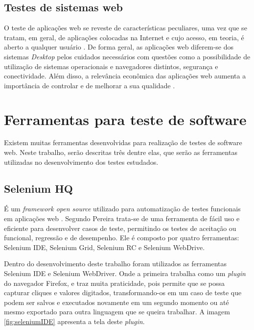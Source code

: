 \documentclass[tg]{mdtufsm}
\begin{document}
\subsection{Testes de sistemas web}
O teste de aplicações web se reveste de características peculiares, uma vez que se tratam, em geral, de aplicações colocadas na Internet e cujo acesso, em teoria,
é aberto a qualquer usuário \cite{rios2006teste}.  De forma geral, as aplicações web diferem-se dos sistemas \emph{Desktop} pelos cuidados necessários com questões como a
possibilidade de utilização de sistemas operacionais e navegadores distintos, segurança e conectividade. Além disso, a relevância econômica das aplicações web aumenta a
importância de controlar e de melhorar a sua qualidade \cite{fidelis2004fireweb}.


\section{Ferramentas para teste de software}
Existem muitas ferramentas desenvolvidas para realização de testes de software web. Neste trabalho, serão descritas três dentre elas, que serão as ferramentas utilizadas no desenvolvimento dos testes estudados.

\subsection{Selenium HQ}
É um \emph{framework open source} utilizado para automatização de testes funcionais em aplicações web \cite{chiavegatto1desenvolvimento}. Segundo Pereira \citeyearpar{pereiraestudoselenium} trata-se
de uma ferramenta de fácil uso e eficiente para desenvolver casos de teste, permitindo os testes de aceitação ou funcional, regressão e de desempenho.
Ele é composto por quatro ferramentas: Selenium IDE, Selenium Grid, Selenium RC e Selenium WebDrive.

Dentro do desenvolvimento deste trabalho foram utilizados as ferramentas Selenium IDE e Selenium WebDriver. Onde a primeira trabalha como um \emph{plugin} do navegador Firefox, e traz muita praticidade, pois permite que se possa capturar cliques e valores digitados, transformando-os em um caso de teste que podem ser salvos e executados novamente em um segundo momento ou até mesmo exportado para outra linguagem que se queira trabalhar. A imagem \ref{fig:seleniumIDE} apresenta a tela deste \emph{plugin}.
\end{document}
